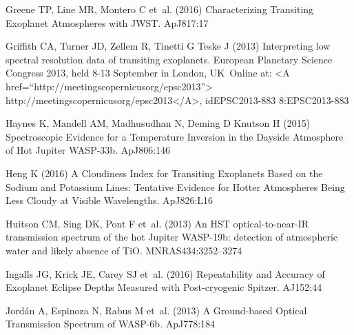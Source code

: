 \documentclass[graybox,natbib,nosecnum]{svmult}
\newcommand*\aj{AJ}
\newcommand*\apj{ApJ}
\newcommand*\apjl{ApJ}
\newcommand*\mnras{MNRAS}
\begin{document}
\begin{thebibliography}{110}
{Greene} TP, {Line} MR, {Montero} C et~al. (2016) {Characterizing Transiting
  Exoplanet Atmospheres with JWST}. \apj 817:17

{Griffith} CA, {Turner} JD, {Zellem} R, {Tinetti} G {Teske} J (2013)
  {Interpreting low spectral resolution data of transiting exoplanets}.
  European Planetary Science Congress 2013, held 8-13 September in London,
  UK~Online at: <A href=``http://meetingscopernicusorg/epsc2013''>
  http://meetingscopernicusorg/epsc2013</A>, idEPSC2013-883 8:EPSC2013-883

{Haynes} K, {Mandell} AM, {Madhusudhan} N, {Deming} D {Knutson} H (2015)
  {Spectroscopic Evidence for a Temperature Inversion in the Dayside Atmosphere
  of Hot Jupiter WASP-33b}. \apj 806:146

{Heng} K (2016) {A Cloudiness Index for Transiting Exoplanets Based on the
  Sodium and Potassium Lines: Tentative Evidence for Hotter Atmospheres Being
  Less Cloudy at Visible Wavelengths}. \apjl 826:L16

{Huitson} CM, {Sing} DK, {Pont} F et~al. (2013) {An HST optical-to-near-IR
  transmission spectrum of the hot Jupiter WASP-19b: detection of atmospheric
  water and likely absence of TiO}. \mnras 434:3252--3274

{Ingalls} JG, {Krick} JE, {Carey} SJ et~al. (2016) {Repeatability and Accuracy
  of Exoplanet Eclipse Depths Measured with Post-cryogenic Spitzer}. \aj 152:44

{Jord{\'a}n} A, {Espinoza} N, {Rabus} M et~al. (2013) {A Ground-based Optical
  Transmission Spectrum of WASP-6b}. \apj 778:184


\end{thebibliography}
\end{document}
